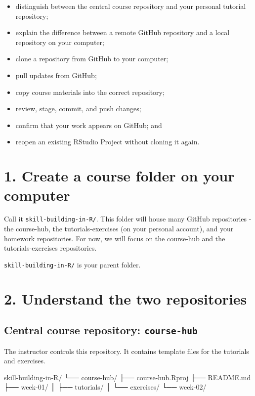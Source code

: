 \documentclass[
  letterpaper,
  DIV=11,
  numbers=noendperiod]{scrartcl}
\newenvironment{Shaded}{\begin{snugshade}}{\end{snugshade}}
\newcommand{\NormalTok}[1]{\textcolor[rgb]{0.00,0.23,0.31}{#1}}
\providecommand{\tightlist}{%
  \setlength{\itemsep}{0pt}\setlength{\parskip}{0pt}}
\begin{document}
\begin{itemize}
\tightlist
\item
  distinguish between the central course repository and your personal
  tutorial repository;
\item
  explain the difference between a remote GitHub repository and a local
  repository on your computer;
\item
  clone a repository from GitHub to your computer;
\item
  pull updates from GitHub;
\item
  copy course materials into the correct repository;
\item
  review, stage, commit, and push changes;
\item
  confirm that your work appears on GitHub; and
\item
  reopen an existing RStudio Project without cloning it again.
\end{itemize}

\section{1. Create a course folder on your
computer}\label{create-a-course-folder-on-your-computer}

Call it \texttt{skill-building-in-R/}. This folder will house many
GitHub repositories - the course-hub, the tutorials-exercises (on your
personal account), and your homework repositories. For now, we will
focus on the course-hub and the tutorials-exercises repositories.

\texttt{skill-building-in-R/} is your parent folder.

\section{2. Understand the two
repositories}\label{understand-the-two-repositories}

\subsection{\texorpdfstring{Central course repository:
\texttt{course-hub}}{Central course repository: course-hub}}\label{central-course-repository-course-hub}

The instructor controls this repository. It contains template files for
the tutorials and exercises.

\begin{Shaded}
\begin{Highlighting}[]
\NormalTok{skill{-}building{-}in{-}R/ }
\NormalTok{└── course{-}hub/}
\NormalTok{    ├── course{-}hub.Rproj}
\NormalTok{    ├── README.md}
\NormalTok{    ├── week{-}01/}
\NormalTok{    │   ├── tutorials/}
\NormalTok{    │   └── exercises/}
\NormalTok{    └── week{-}02/}
\end{Highlighting}
\end{Shaded}
\end{document}
